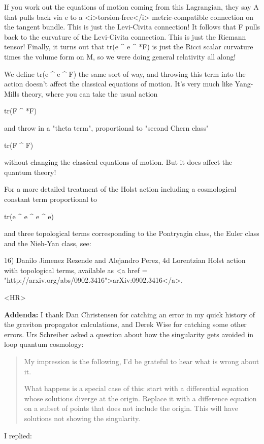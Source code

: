 If you work out the equations of motion coming from this Lagrangian,
they say A that pulls back via e to a <i>torsion-free</i>
metric-compatible connection on the tangent bundle.  This is just the
Levi-Civita connection!  It follows that F pulls back to the curvature
of the Levi-Civita connection.  This is just the Riemann tensor!
Finally, it turns out that tr(e ^ e ^ *F) is just the Ricci scalar
curvature times the volume form on M, so we were doing general
relativity all along!

We define tr(e ^ e ^ F) the same sort of way, and throwing this term
into the action doesn't affect the classical equations of motion.
It's very much like Yang-Mills theory, where you can take the usual
action

tr(F ^ *F)

and throw in a "theta term", proportional to
"second Chern class"

tr(F ^ F)

without changing the classical equations of motion.  But it does
affect the quantum theory!  

For a more detailed treatment of the Holst action including 
a cosmological constant term proportional to

tr(e ^ e ^ e ^ e)

and three topological terms corresponding to the Pontryagin 
class, the Euler class and the Nieh-Yan class, see:

16) Danilo Jimenez Rezende and Alejandro Perez, 
4d Lorentzian Holst action with topological terms, 
available as <a href = "http://arxiv.org/abs/0902.3416">arXiv:0902.3416</a>.

<HR>

\textbf{Addenda:} I thank Dan Christensen for catching an error
in my quick history of the graviton propagator calculations, and
Derek Wise for catching some other errors.  
Urs Schreiber asked a question about how the singularity gets
avoided in loop quantum cosmology:

\begin{quote}

My impression is the following, I'd be grateful to hear what is wrong
about it.

What happens is a special case of this: start with a differential
equation whose solutions diverge at the origin. Replace it with a
difference equation on a subset of points that does not include the
origin. This will have solutions not showing the singularity.
\end{quote}
    

I replied:



